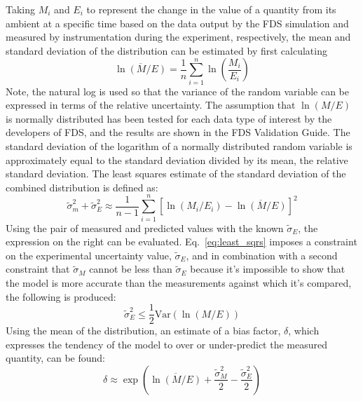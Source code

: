 Taking $M_i$ and $E_i$ to represent the change in the value of a quantity from its ambient at a specific time based on the data output by the FDS simulation and measured by instrumentation during the experiment, respectively, the mean and standard deviation of the distribution can be estimated by first calculating
\begin{equation} 
	\overline{\ln(M/E)}=\frac{1}{n} \sum_{i=1}^n \ln\left( \frac{M_i}{E_i} \right)
\end{equation}
Note, the natural log is used so that the variance of the random variable can be expressed in terms of the relative uncertainty. The assumption that $\ln(M/E)$ is normally distributed has been tested for each data type of interest by the developers of FDS, and the results are shown in the FDS Validation Guide. The standard deviation of the logarithm of a normally distributed random variable is approximately equal to the standard deviation divided by its mean, the relative standard deviation. The least squares estimate of the standard deviation of the combined distribution is defined as:
\begin{equation}
\label{eq:least_sqrs}
	\widetilde{\sigma}_m^2 + \widetilde{\sigma}_E^2 \approx \frac{1}{n-1}\sum_{i=1}^n \left[ \ln(M_i/E_i) - \overline{\ln(M/E)} \right]^2
\end{equation}
Using the pair of measured and predicted values with the known $\widetilde{\sigma}_E$, the expression on the right can be evaluated. Eq.~\ref{eq:least_sqrs} imposes a constraint on the experimental uncertainty value, $\widetilde{\sigma}_E$, and in combination with a second constraint that $\widetilde{\sigma}_M$ cannot be less than $\widetilde{\sigma}_E$ because it's impossible to show that the model is more accurate than the measurements against which it's compared, the following is produced:
\begin{equation}
	\widetilde{\sigma}_E^2 \leq \frac{1}{2}\textrm{Var}(\ln(M/E))
\end{equation}
Using the mean of the distribution, an estimate of a bias factor, $\delta$, which expresses the tendency of the model to over or under-predict the measured quantity, can be found:
\begin{equation}
	\delta \approx \exp\left( \overline{\ln(M/E)}+\frac{\widetilde{\sigma}_M^2}{2}-\frac{\widetilde{\sigma}_E^2}{2} \right)
\end{equation}

